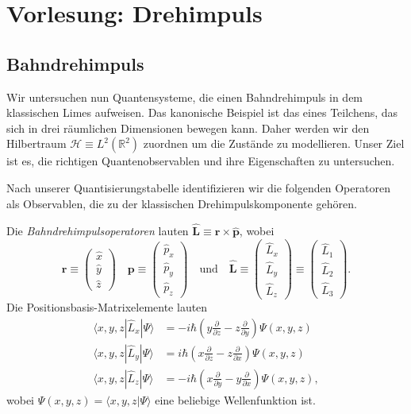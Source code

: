 \section{Vorlesung: Drehimpuls}

\subsection{Bahndrehimpuls}
Wir untersuchen nun Quantensysteme, die einen Bahndrehimpuls in dem klassischen Limes aufweisen. Das kanonische Beispiel ist das eines Teilchens, das sich in drei räumlichen Dimensionen bewegen kann. Daher werden wir den Hilbertraum $\mathcal{H} \equiv L^2(\mathbb{R}^2)$ zuordnen um die Zustände zu modellieren. Unser Ziel ist es, die richtigen Quantenobservablen und ihre Eigenschaften zu untersuchen.

Nach unserer Quantisierungstabelle identifizieren wir die folgenden Operatoren als Observablen, die zu der klassischen Drehimpulskomponente gehören.
\begin{definition}
	Die \emph{Bahndrehimpulsoperatoren} lauten $\widehat{\mathbf{L}} \equiv \widehat{\mathbf{r}}\times \widehat{\mathbf{p}}$, wobei 
	\begin{equation}
		\mathbf{r} \equiv \begin{pmatrix}
			\widehat{x} \\
			\widehat{y} \\
			\widehat{z} 
		\end{pmatrix}\quad
		\mathbf{p} \equiv \begin{pmatrix}
			\widehat{p}_x \\
			\widehat{p}_y \\
			\widehat{p}_z 
		\end{pmatrix}\quad\text{und}\quad \widehat{\mathbf{L}} \equiv \begin{pmatrix}
			\widehat{L}_x \\
			\widehat{L}_y \\
			\widehat{L}_z 
		\end{pmatrix} \equiv \begin{pmatrix}
			\widehat{L}_1 \\
			\widehat{L}_2 \\
			\widehat{L}_3 
		\end{pmatrix}.
	\end{equation}
	Die Positionsbasis-Matrixelemente lauten  
	\begin{align}
		\langle x,y,z|\widehat{L}_x|\Psi\rangle &= -i{\hbar} \left(y\frac{\partial}{\partial z} - z\frac{\partial}{\partial y} \right)\Psi(x,y,z) \\
		\langle x,y,z|\widehat{L}_y|\Psi\rangle &=  i{\hbar} \left(x\frac{\partial}{\partial z} - z\frac{\partial}{\partial x} \right)\Psi(x,y,z) \\
		\langle x,y,z|\widehat{L}_z|\Psi\rangle &=  -i{\hbar} \left(x\frac{\partial}{\partial y} - y\frac{\partial}{\partial x} \right)\Psi(x,y,z),
	\end{align}
	wobei $\Psi(x,y,z) = \langle x,y,z|\Psi\rangle$ eine beliebige Wellenfunktion ist. 
\end{definition}

